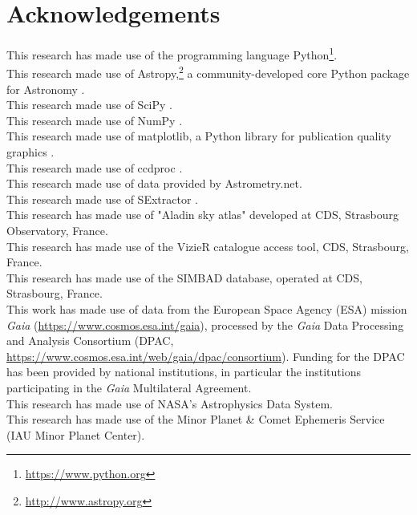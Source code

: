 \documentclass{article}
\begin{document}

\newpage
\section{Acknowledgements}

This research has made use of the programming language Python\footnote{\url{https://www.python.org}}.\\ %
This research made use of Astropy,\footnote{\url{http://www.astropy.org}} a community-developed core Python package for Astronomy \parencite{Astropy1,Astropy2}. \\
This research made use of SciPy \parencite{jones_scipy_2001}.\\
This research made use of NumPy \parencite{van2011numpy}.\\
This research made use of matplotlib, a Python library for publication quality graphics \parencite{Hunter:2007}.\\
This research made use of ccdproc \parencite{2015ascl.soft10007C}.\\
This research made use of data provided by Astrometry.net. \parencite{Astrometry}\\
This research made use of SExtractor \parencite{SExtractor}. \\
This research has made use of "Aladin sky atlas" developed at CDS, Strasbourg Observatory, France.\\ 
This research has made use of the VizieR catalogue access tool, CDS, Strasbourg, France.\\
This research has made use of the SIMBAD database, operated at CDS, Strasbourg, France.\\
This work has made use of data from the European Space Agency (ESA) mission
{\it Gaia} (\url{https://www.cosmos.esa.int/gaia}), processed by the {\it Gaia}
Data Processing and Analysis Consortium (DPAC,
\url{https://www.cosmos.esa.int/web/gaia/dpac/consortium}). Funding for the DPAC
has been provided by national institutions, in particular the institutions
participating in the {\it Gaia} Multilateral Agreement.\\
This research has made use of NASA's Astrophysics Data System.\\
This research has made use of the Minor Planet \& Comet Ephemeris Service (IAU Minor Planet Center).\\
\end{document}
